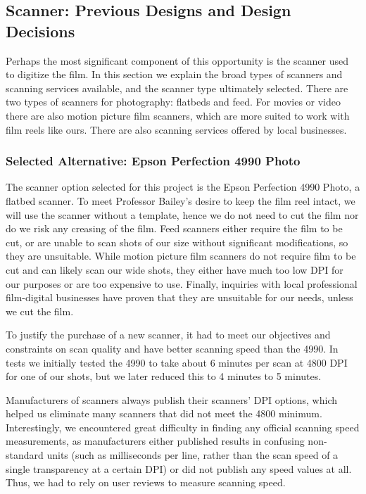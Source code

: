 \documentclass[12pt]{article} %
\begin{document}
\subsection{Scanner: Previous Designs and Design Decisions} \label{scanneralts}
Perhaps the most significant component of this opportunity is the scanner used to digitize the film. In this section we explain the broad types of scanners and scanning services available, and the scanner type ultimately selected. There are two types of scanners for photography: flatbeds and feed. For movies or video there are also motion picture film scanners, which are more suited to work with film reels like ours. There are also scanning services offered by local businesses.

\subsubsection{Selected Alternative: Epson Perfection 4990 Photo} \label{selectedscannertype}
The scanner option selected for this project is the Epson Perfection 4990 Photo, a flatbed scanner. To meet Professor Bailey's desire to keep the film reel intact, we will use the scanner without a template, hence we do not need to cut the film nor do we risk any creasing of the film. Feed scanners either require the film to be cut, or are unable to scan shots of our size without significant modifications, so they are unsuitable. While motion picture film scanners do not require film to be cut and can likely scan our wide shots, they either have much too low DPI for our purposes or are too expensive to use. Finally, inquiries with local professional film-digital businesses have proven that they are unsuitable for our needs, unless we cut the film.

To justify the purchase of a new scanner, it had to meet our objectives and constraints on scan quality and have better scanning speed than the 4990. In tests we initially tested the 4990 to take about 6 minutes per scan at 4800 DPI for one of our shots, but we later reduced this to 4 minutes to 5 minutes.

Manufacturers of scanners always publish their scanners' DPI options, which helped us eliminate many scanners that did not meet the 4800 minimum. Interestingly, we encountered great difficulty in finding any official scanning speed measurements, as manufacturers either published results in confusing non-standard units (such as milliseconds per line, rather than the scan speed of a single transparency at a certain DPI) or did not publish any speed values at all. Thus, we had to rely on user reviews to measure scanning speed. 
\end{document}
